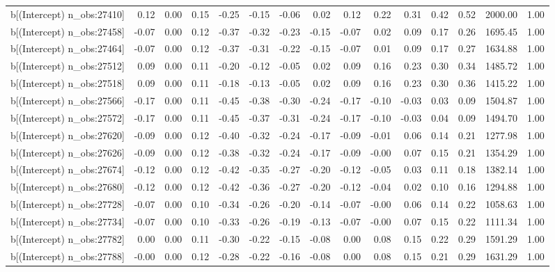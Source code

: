 \begin{table}[ht]
\begin{tabular}{rrrrrrrrrrrrrrr}
  b[(Intercept) n\_obs:27410] & 0.12 & 0.00 & 0.15 & -0.25 & -0.15 & -0.06 & 0.02 & 0.12 & 0.22 & 0.31 & 0.42 & 0.52 & 2000.00 & 1.00 \\ 
  b[(Intercept) n\_obs:27458] & -0.07 & 0.00 & 0.12 & -0.37 & -0.32 & -0.23 & -0.15 & -0.07 & 0.02 & 0.09 & 0.17 & 0.26 & 1695.45 & 1.00 \\ 
  b[(Intercept) n\_obs:27464] & -0.07 & 0.00 & 0.12 & -0.37 & -0.31 & -0.22 & -0.15 & -0.07 & 0.01 & 0.09 & 0.17 & 0.27 & 1634.88 & 1.00 \\ 
  b[(Intercept) n\_obs:27512] & 0.09 & 0.00 & 0.11 & -0.20 & -0.12 & -0.05 & 0.02 & 0.09 & 0.16 & 0.23 & 0.30 & 0.34 & 1485.72 & 1.00 \\ 
  b[(Intercept) n\_obs:27518] & 0.09 & 0.00 & 0.11 & -0.18 & -0.13 & -0.05 & 0.02 & 0.09 & 0.16 & 0.23 & 0.30 & 0.36 & 1415.22 & 1.00 \\ 
  b[(Intercept) n\_obs:27566] & -0.17 & 0.00 & 0.11 & -0.45 & -0.38 & -0.30 & -0.24 & -0.17 & -0.10 & -0.03 & 0.03 & 0.09 & 1504.87 & 1.00 \\ 
  b[(Intercept) n\_obs:27572] & -0.17 & 0.00 & 0.11 & -0.45 & -0.37 & -0.31 & -0.24 & -0.17 & -0.10 & -0.03 & 0.04 & 0.09 & 1494.70 & 1.00 \\ 
  b[(Intercept) n\_obs:27620] & -0.09 & 0.00 & 0.12 & -0.40 & -0.32 & -0.24 & -0.17 & -0.09 & -0.01 & 0.06 & 0.14 & 0.21 & 1277.98 & 1.00 \\ 
  b[(Intercept) n\_obs:27626] & -0.09 & 0.00 & 0.12 & -0.38 & -0.32 & -0.24 & -0.17 & -0.09 & -0.00 & 0.07 & 0.15 & 0.21 & 1354.29 & 1.00 \\ 
  b[(Intercept) n\_obs:27674] & -0.12 & 0.00 & 0.12 & -0.42 & -0.35 & -0.27 & -0.20 & -0.12 & -0.05 & 0.03 & 0.11 & 0.18 & 1382.14 & 1.00 \\ 
  b[(Intercept) n\_obs:27680] & -0.12 & 0.00 & 0.12 & -0.42 & -0.36 & -0.27 & -0.20 & -0.12 & -0.04 & 0.02 & 0.10 & 0.16 & 1294.88 & 1.00 \\ 
  b[(Intercept) n\_obs:27728] & -0.07 & 0.00 & 0.10 & -0.34 & -0.26 & -0.20 & -0.14 & -0.07 & -0.00 & 0.06 & 0.14 & 0.22 & 1058.63 & 1.00 \\ 
  b[(Intercept) n\_obs:27734] & -0.07 & 0.00 & 0.10 & -0.33 & -0.26 & -0.19 & -0.13 & -0.07 & -0.00 & 0.07 & 0.15 & 0.22 & 1111.34 & 1.00 \\ 
  b[(Intercept) n\_obs:27782] & 0.00 & 0.00 & 0.11 & -0.30 & -0.22 & -0.15 & -0.08 & 0.00 & 0.08 & 0.15 & 0.22 & 0.29 & 1591.29 & 1.00 \\ 
  b[(Intercept) n\_obs:27788] & -0.00 & 0.00 & 0.12 & -0.28 & -0.22 & -0.16 & -0.08 & 0.00 & 0.08 & 0.15 & 0.21 & 0.29 & 1631.29 & 1.00 \\ 

\end{tabular}
\end{table}
